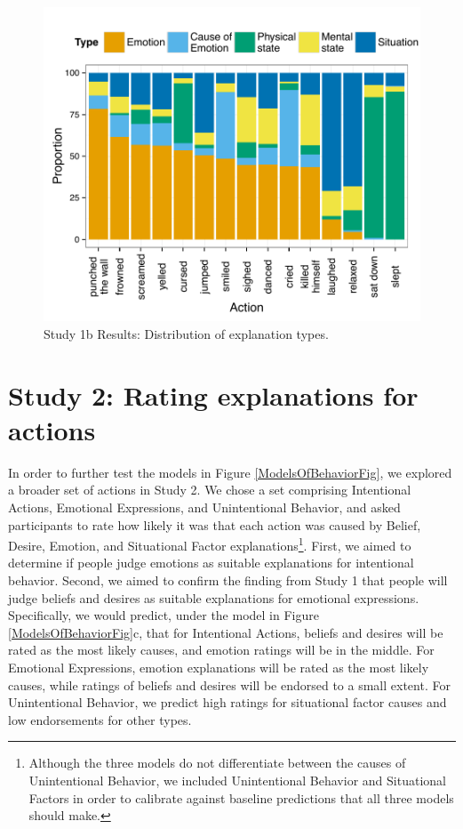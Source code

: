 \documentclass[10pt,letterpaper]{article}
\begin{document}
\begin{figure}[thb]
\begin{center}\includegraphics[width=1.0\columnwidth]{images/study1b_codePlot.pdf}\end{center}
\caption{ Study 1b Results: Distribution of explanation types. }
\label{Study1bResultsFig}
\end{figure}






\section{Study 2: Rating explanations for actions}


In order to further test the models in Figure \ref{ModelsOfBehaviorFig}, we explored a broader set of actions in Study 2. 
We chose a set comprising Intentional Actions, Emotional Expressions, and Unintentional Behavior, and asked participants to rate how likely it was that each action was caused by Belief, Desire, Emotion, and Situational Factor explanations\footnote{Although the three models do not differentiate between the causes of Unintentional Behavior, we included Unintentional Behavior and Situational Factors in order to calibrate against baseline predictions that all three models should make.
}. First, we aimed to determine if people judge emotions as suitable explanations for intentional behavior. Second, we aimed to confirm the finding from Study 1 that people will judge beliefs and desires as suitable explanations for emotional expressions. 
Specifically, we would predict, under the model in Figure \ref{ModelsOfBehaviorFig}c, that for Intentional Actions, beliefs and desires will be rated as the most likely causes, and emotion ratings will be in the middle. For Emotional Expressions, emotion explanations will be rated as the most likely causes, while ratings of beliefs and desires will be endorsed to a small extent. For Unintentional Behavior, we predict high ratings for situational factor causes and low endorsements for other types.
\end{document}

